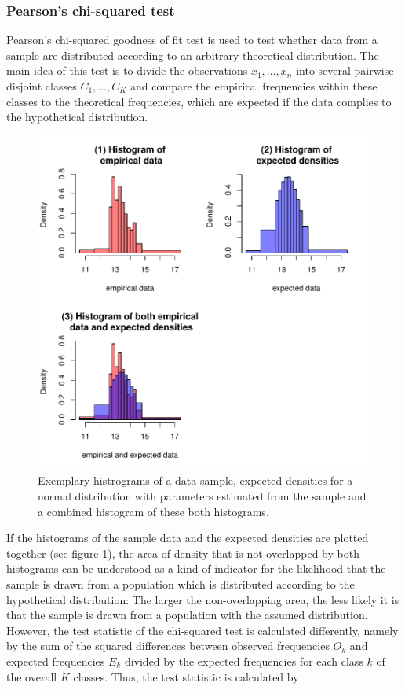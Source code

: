 \documentclass[a4paper, 12pt, titlepage, headsepline, listof = totoc, bibliography = totoc, numbers = noenddot]{scrartcl}
\begin{document}
\subsubsection{Pearson's chi-squared test}\label{sec:chisq-theoretical}
Pearson's chi-squared goodness of fit test is used to test whether data from a sample are distributed according to an arbitrary theoretical distribution. The main idea of this test is to divide the observations $x_1, \dots, x_n$ into several pairwise disjoint classes $C_1, \dots, C_K$ and compare the empirical frequencies within these classes to the theoretical frequencies, which are expected if the data complies to the hypothetical distribution.
\begin{figure}[h!]
\includegraphics[width=\textwidth]{report-chisqSampleHist}
\caption{Exemplary histrograms of a data sample, expected densities for a normal distribution with parameters estimated from the sample and a combined histogram of these both histograms.}
\label{fig:chisqSampleHist}
\end{figure}
If the histograms of the sample data and the expected densities are plotted together (see figure \ref{fig:chisqSampleHist}), the area of density that is not overlapped by both histograms can be understood as a kind of indicator for the likelihood that the sample is drawn from a population which is distributed according to the hypothetical distribution: The larger the non-overlapping area, the less likely it is that the sample is drawn from a population with the assumed distribution. However, the test statistic of the chi-squared test is calculated differently, namely by the sum of the squared differences between observed frequencies $O_k$ and expected frequencies $E_k$ divided by the expected frequencies for each class $k$ of the overall $K$ classes. Thus, the test statistic is calculated by
\end{document}
